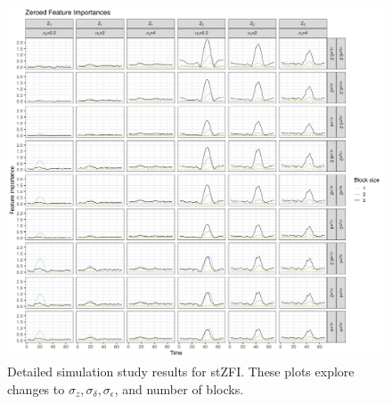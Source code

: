 \documentclass[AMS,STIX2COL]{WileyNJD-v2}
\begin{document}
\begin{figure}[h]
    \centering
    \includegraphics[width=\textwidth]{figures/simulation_zfi_supplement.png}
    \caption{Detailed simulation study results for stZFI. These plots explore changes to $\sigma_z,\sigma_{\delta},\sigma_{\epsilon}$, and number of blocks.}
    \label{fig:zfi-supplement}
\end{figure}
\end{document}
